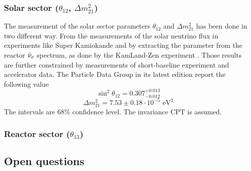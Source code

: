 \subsubsection{Solar sector ($\theta_{12}$, $\Delta m^2_{21}$)}

The measurement of the solar sector parameters $\theta_{12}$ and $\Delta m^2_{21}$ has been done in two different way. From the measurements of the solar neutrino flux in experiments like Super Kamiokande \cite{super-kamiokande_collaboration_solar_2016} and by extracting the parameter from the reactor $\bar{\nu}_{e}$ spectrum, as done by the KamLand-Zen experiment \cite{suzuki_results_2005, kamland_collaboration_reactor_2013}. Those results are further constrained by measurements of short-baseline experiment and accelerator data. The Particle Data Group in its latest edition \cite{ParticleDataGroup:2024cfk} report the following value
\begin{equation*}
  \sin^2\theta_{12} = 0.307^{+0.013}_{-0.012}
\end{equation*}
\begin{equation*}
  \Delta m^2_{21} = 7.53 \pm 0.18 \cdot 10^{-5} \text{ eV}^2
\end{equation*}
The intervals are 68\% confidence level. The invariance CPT is assumed.

\subsubsection{Reactor sector ($\theta_{13}$)}


\subsection{Open questions}
